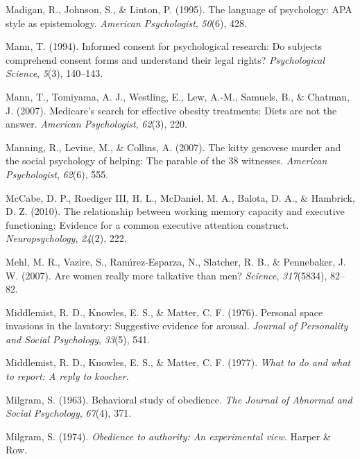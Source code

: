 \documentclass[
]{krantz}
\newlength{\cslhangindent}
\newlength{\cslentryspacingunit} %
\newenvironment{CSLReferences}[2] %
 {%
  \setlength{\parindent}{0pt}
  \ifodd #1
  \let\oldpar\par
  \def\par{\hangindent=\cslhangindent\oldpar}
  \fi
  \setlength{\parskip}{#2\cslentryspacingunit}
 }%
 {}
\begin{document}
\begin{CSLReferences}{1}{0}
\leavevmode{}%
Madigan, R., Johnson, S., \& Linton, P. (1995). The language of psychology: APA style as epistemology. \emph{American Psychologist}, \emph{50}(6), 428.

\leavevmode{}%
Mann, T. (1994). Informed consent for psychological research: Do subjects comprehend consent forms and understand their legal rights? \emph{Psychological Science}, \emph{5}(3), 140--143.

\leavevmode{}%
Mann, T., Tomiyama, A. J., Westling, E., Lew, A.-M., Samuels, B., \& Chatman, J. (2007). Medicare's search for effective obesity treatments: Diets are not the answer. \emph{American Psychologist}, \emph{62}(3), 220.

\leavevmode{}%
Manning, R., Levine, M., \& Collins, A. (2007). The kitty genovese murder and the social psychology of helping: The parable of the 38 witnesses. \emph{American Psychologist}, \emph{62}(6), 555.

\leavevmode{}%
McCabe, D. P., Roediger III, H. L., McDaniel, M. A., Balota, D. A., \& Hambrick, D. Z. (2010). The relationship between working memory capacity and executive functioning: Evidence for a common executive attention construct. \emph{Neuropsychology}, \emph{24}(2), 222.

\leavevmode{}%
Mehl, M. R., Vazire, S., Ramı́rez-Esparza, N., Slatcher, R. B., \& Pennebaker, J. W. (2007). Are women really more talkative than men? \emph{Science}, \emph{317}(5834), 82--82.

\leavevmode{}%
Middlemist, R. D., Knowles, E. S., \& Matter, C. F. (1976). Personal space invasions in the lavatory: Suggestive evidence for arousal. \emph{Journal of Personality and Social Psychology}, \emph{33}(5), 541.

\leavevmode{}%
Middlemist, R. D., Knowles, E. S., \& Matter, C. F. (1977). \emph{What to do and what to report: A reply to koocher.}

\leavevmode{}%
Milgram, S. (1963). Behavioral study of obedience. \emph{The Journal of Abnormal and Social Psychology}, \emph{67}(4), 371.

\leavevmode{}%
Milgram, S. (1974). \emph{Obedience to authority: An experimental view}. Harper \& Row.


\end{CSLReferences}
\end{document}
